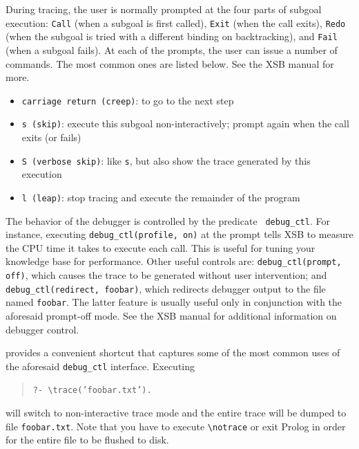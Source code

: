 \documentclass[11pt]{article}
\newcommand{\ERGO}{\mbox{\smaller{\ensuremath{\cal{E}}\smaller{{\sc{RGO}}}}}\xspace}
\newcommand{\FLSYSTEM}{\ERGO}
\newcommand{\bs}{\textbackslash}
\begin{document}
During tracing, the user is normally prompted at the four parts of subgoal
execution: {\tt Call} (when a subgoal is first called), {\tt Exit} (when
the call exits), {\tt Redo} (when the subgoal is tried with a different
binding on backtracking), and {\tt Fail} (when a subgoal fails).
At each of the prompts, the user can issue a number of commands. The most
common ones are listed below. See the XSB manual for more.
\begin{itemize}
  \item {\tt carriage return (creep)}:  to go to the next step  
  \item {\tt s (skip)}: execute this subgoal non-interactively; prompt
    again when the call exits (or fails)
  \item {\tt S (verbose skip)}: like {\tt s}, but also show the trace
    generated by this execution
  \item {\tt l (leap)}: stop tracing and execute the remainder of the
    program
\end{itemize}
The behavior of the debugger is controlled by the predicate {\tt
  debug\_ctl}. For instance, executing {\tt debug\_ctl(profile, on)} at the
\FLSYSTEM prompt tells XSB to measure the CPU time it takes to execute each
call. This is useful for tuning your knowledge base for performance. Other useful
controls are: {\tt debug\_ctl(prompt, off)}, which causes the trace to be
generated without user intervention; and {\tt debug\_ctl(redirect,
  foobar)}, which redirects debugger output to the file named {\tt foobar}.
The latter feature is usually useful only in conjunction with the aforesaid
prompt-off mode. See the XSB manual for additional information on debugger
control.

\index{\bs{}trace/1}
\FLSYSTEM provides a convenient shortcut that captures some of the most common
uses of the aforesaid {\tt debug\_ctl} interface. Executing
\begin{quote}
  {\tt     ?- \bs{}trace('foobar.txt').}
\end{quote}
will switch \FLSYSTEM to non-interactive trace mode
and the entire trace will be dumped to file {\tt foobar.txt}.
Note that you have to execute {\tt \bs{}notrace} or exit Prolog in order for the
entire file to be flushed to disk.
\end{document}
